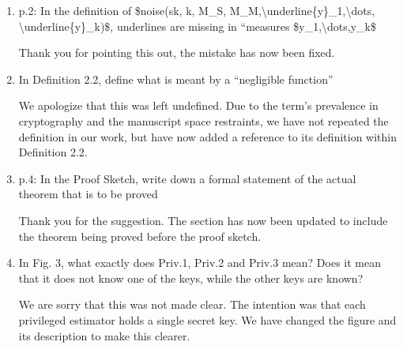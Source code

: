 \documentclass[a4paper]{scrartcl}
\newenvironment{rebuttal}{\begin{enumerate}[label={\color{grey}\thesection.\arabic{enumi}},leftmargin=0pt,ref=\thesection.\arabic{enumi}]}{\end{enumerate}}
\newcommand{\reviewtext}[1]{{\color{nblue} #1}}
\begin{document}
\begin{rebuttal}
\item \reviewtext{p.2: In the definition of \$noise(sk, k, M\_S, M\_M,\textbackslash underline\{y\}\_1,\textbackslash dots, \textbackslash underline\{y\}\_k)\$, underlines are missing in ``measures \$y\_1,\textbackslash dots,y\_k\$}

Thank you for pointing this out, the mistake has now been fixed.

\item \reviewtext{In Definition 2.2, define what is meant by a ``negligible function''}

We apologize that this was left undefined. Due to the term's prevalence in cryptography and the manuscript space restraints, we have not repeated the definition in our work, but have now added a reference to its definition within Definition 2.2.

\item \reviewtext{p.4: In the Proof Sketch, write down a formal statement of the actual theorem that is to be proved}

Thank you for the suggestion. The section has now been updated to include the theorem being proved before the proof sketch.

\item \reviewtext{In Fig. 3, what exactly does  Priv.1, Priv.2 and Priv.3 mean? Does it
mean that it does not know one of the keys, while the other keys are
known?}

We are sorry that this was not made clear. The intention was that each privileged estimator holds a single secret key. We have changed the figure and its description to make this clearer.

\end{rebuttal}

\end{document}
